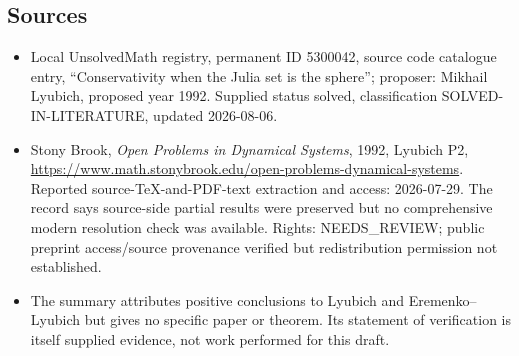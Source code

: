\documentclass[11pt]{article}
\begin{document}
\subsection{Sources}
\begin{itemize}
\item Local UnsolvedMath registry, permanent ID 5300042, source code catalogue entry, ``Conservativity when the Julia set is the sphere''; proposer: Mikhail Lyubich, proposed year 1992. Supplied status solved, classification SOLVED-IN-LITERATURE, updated 2026-08-06.
\item Stony Brook, \emph{Open Problems in Dynamical Systems}, 1992, Lyubich P2, \url{https://www.math.stonybrook.edu/open-problems-dynamical-systems}. Reported source-TeX-and-PDF-text extraction and access: 2026-07-29. The record says source-side partial results were preserved but no comprehensive modern resolution check was available. Rights: NEEDS\_REVIEW; public preprint access/source provenance verified but redistribution permission not established.
\item The summary attributes positive conclusions to Lyubich and Eremenko--Lyubich but gives no specific paper or theorem. Its statement of verification is itself supplied evidence, not work performed for this draft.
\end{itemize}
\end{document}
